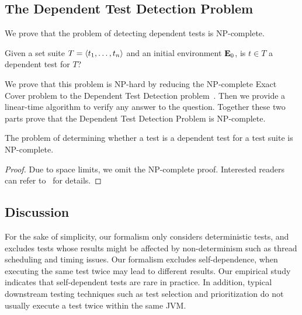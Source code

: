 \subsection{The Dependent Test Detection Problem}

We prove that the problem of detecting dependent tests
 is NP-complete.


\begin{definition}
Given a set suite\/ $T =  \langle t_1, \dots, t_n \rangle $ and an initial environment\/
$\mathbf{E}_0$, is $t \in T$ a dependent test for $T$?
\end{definition}

We prove that this problem is NP-hard by reducing the NP-complete Exact Cover problem
to the Dependent Test Detection
problem~\cite{karp:NP:1972}. 
Then we provide a linear-time algorithm to verify any answer to the
question.
Together these two parts prove that the Dependent Test Detection Problem is NP-complete.

\begin{theorem}
The problem of determining whether a test is a dependent test for
a test suite is NP-complete.
\end{theorem}

\begin{proof}
Due to space limits, we omit the NP-complete proof. Interested
readers can refer to~\cite{testdependence} for details.
\end{proof}

%

\subsection{Discussion}
\label{sec:formaldiscussion}

For the sake of simplicity, our formalism only
considers deterministic tests,
and excludes tests whose results might be affected by
non-determinism such as thread scheduling
and timing issues.
Our formalism excludes self-dependence, 
when executing the same test twice
may lead to different results. Our empirical study
indicates that self-dependent tests
are rare in practice. In addition, typical
downstream testing techniques such as test selection and
prioritization do not usually execute a test twice within the same JVM.




